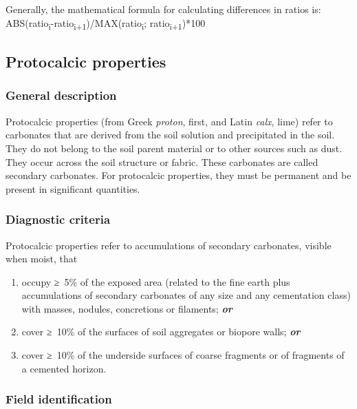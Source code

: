 \documentclass[
  letterpaper,
  DIV=11,
  numbers=noendperiod]{scrreprt}
\providecommand{\tightlist}{%
  \setlength{\itemsep}{0pt}\setlength{\parskip}{0pt}}\usepackage{longtable,booktabs,array}
\begin{document}
Generally, the mathematical formula for calculating differences in
ratios is:\\
ABS(ratio\textsubscript{i}-ratio\textsubscript{i+1})/MAX(ratio\textsubscript{i};
ratio\textsubscript{i+1})*100

\hypertarget{protocalcic-properties}{%
\subsection{Protocalcic properties}\label{protocalcic-properties}}

\hypertarget{general-description-46}{%
\subsubsection{General description}\label{general-description-46}}

Protocalcic properties (from Greek \emph{proton}, first, and Latin
\emph{calx}, lime) refer to carbonates that are derived from the soil
solution and precipitated in the soil. They do not belong to the soil
parent material or to other sources such as dust. They occur across the
soil structure or fabric. These carbonates are called secondary
carbonates. For protocalcic properties, they must be permanent and be
present in significant quantities.

\hypertarget{diagnostic-criteria-47}{%
\subsubsection{Diagnostic criteria}\label{diagnostic-criteria-47}}

Protocalcic properties refer to accumulations of secondary carbonates,
visible when moist, that

\begin{enumerate}
\def\labelenumi{\arabic{enumi}.}
\tightlist
\item
  occupy ≥~5\% of the exposed area (related to the fine earth plus
  accumulations of secondary carbonates of any size and any cementation
  class) with masses, nodules, concretions or filaments;
  \textbf{\emph{or}}
\item
  cover ≥~10\% of the surfaces of soil aggregates or biopore walls;
  \textbf{\emph{or}}
\item
  cover ≥~10\% of the underside surfaces of coarse fragments or of
  fragments of a cemented horizon.
\end{enumerate}

\hypertarget{field-identification-35}{%
\subsubsection{Field identification}\label{field-identification-35}}
\end{document}
